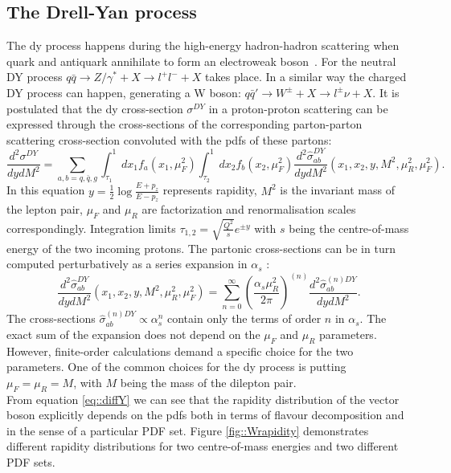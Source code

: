  		\subsection{The Drell-Yan process}
		The \gls{dy} process happens during the high-energy hadron-hadron scattering when quark and antiquark annihilate to form an electroweak boson~\cite{drellyan}. For the neutral DY process $q\bar q \rightarrow Z/\gamma^* + X \rightarrow l^{+}l^{-} + X$ takes place. In a similar way the charged DY process can happen, generating a W boson: $ q\bar q' \rightarrow W^{\pm} +X \rightarrow l^{\pm}\nu + X$. It is postulated that the \gls{dy} cross-section $\sigma^{DY} $ in a proton-proton scattering  can be expressed through the cross-sections of the corresponding parton-parton scattering cross-section convoluted with the \gls{pdf}s of these partons:
		\begin{equation}
		\frac{d^2\sigma^{DY}}{dydM^2}=\sum_{a,b=q,\bar q,g}\int_{\tau_1}^1 dx_1 f_a(x_1,\mu_F^2) \int_{\tau_2}^1 dx_2 f_b(x_2,\mu_F^2)\frac{d^2\hat{\sigma}_{ab}^{DY}}{dydM^2}(x_1,x_2,y,M^2,\mu_R^2,\mu_F^2).
		\label{eq::diffY}
		\end{equation}
		In this equation $y=\frac{1}{2}\log{\frac{E+p_z}{E-p_z}}$ represents rapidity, $M^2$ is the invariant mass of the lepton pair, $\mu_F$ and $\mu_R$ are factorization and renormalisation scales correspondingly. Integration limits $\tau_{1,2}=\sqrt{\frac{Q^2}{s}}e^{\pm y}$ with $s$ being the centre-of-mass energy of the two incoming protons. The partonic cross-sections can be in turn computed perturbatively as a series expansion in $\alpha_s$ \cite{proton_struct}:
		\begin{equation}
		\frac{d^2\hat{\sigma}_{ab}^{DY}}{dydM^2}(x_1,x_2,y,M^2,\mu_R^2,\mu_F^2)=\sum_{n=0}^{\infty}\left(\frac{\alpha_s\mu^2_R}{2\pi}\right)^{(n)}\frac{d^2\hat{\sigma}_{ab}^{(n)DY}}{dydM^2}.
		\end{equation}
		The cross-sections $\hat{\sigma}_{ab}^{(n)DY} \propto \alpha_s^n$ contain only the terms of order $n$ in $\alpha_s$. 
		The exact sum of the expansion does not depend on the $\mu_F$ and $\mu_R$ parameters. However, finite-order calculations demand a specific choice for the two parameters. One of the common choices for the \gls{dy} process is putting  $\mu_F=\mu_R=M$, with $M$ being the mass of the dilepton pair. \\
		From equation \ref{eq::diffY} we can see that the rapidity distribution of the vector boson explicitly depends on the \gls{pdf}s both in terms of flavour decomposition and in the sense of a particular PDF set. Figure \ref{fig::Wrapidity} demonstrates different rapidity distributions for two centre-of-mass energies and two different PDF sets.\\
